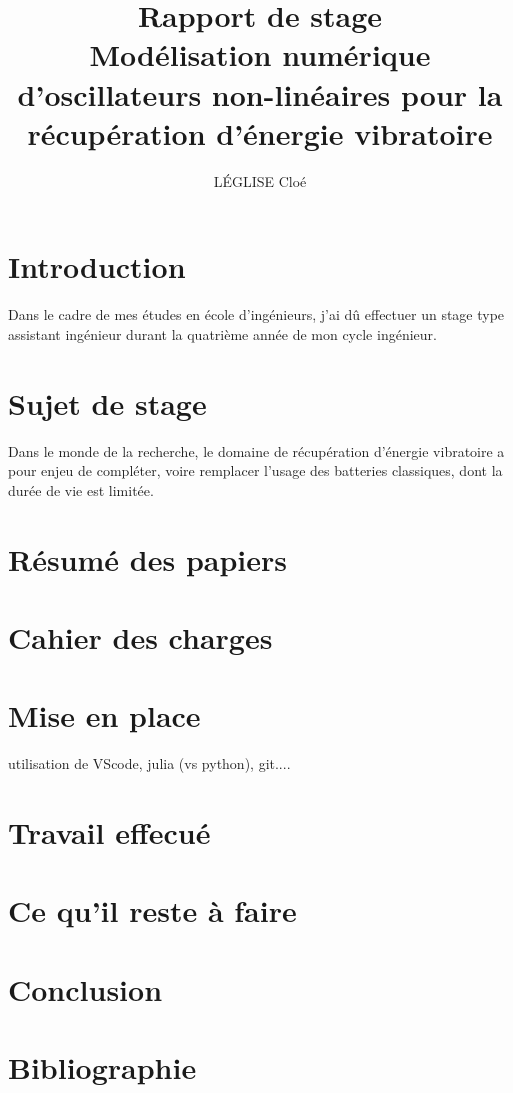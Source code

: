 \documentclass[a4paper, french, 12pt, titlepage]{report}
\title{Rapport de stage \\ Modélisation numérique d’oscillateurs non-linéaires pour
la récupération d’énergie vibratoire}
\author{LÉGLISE Cloé}
\begin{document}
\maketitle

\section{Introduction}

Dans le cadre de mes études en école d'ingénieurs, j'ai dû effectuer un stage type assistant ingénieur durant la quatrième année de mon cycle ingénieur. 

\section{Sujet de stage}

Dans le monde de la recherche, le domaine de récupération d'énergie vibratoire a pour enjeu de compléter, voire remplacer l'usage des batteries classiques, dont la durée de vie est limitée.  

\section{Résumé des papiers}

\section{Cahier des charges}

\section{Mise en place}
utilisation de VScode, julia (vs python), git.... 

\section{Travail effecué}

\section{Ce qu'il reste à faire}

\section{Conclusion}



\section*{Bibliographie}
\end{document}
